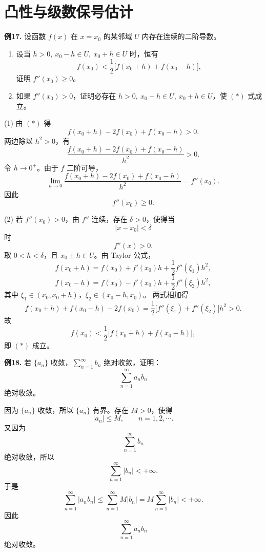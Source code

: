 \section{凸性与级数保号估计}

\begin{problemblock}
\textbf{例17.} 设函数 \(f(x)\) 在 \(x=x_0\) 的某邻域 \(U\) 内存在连续的二阶导数。

\begin{enumerate}[label=(\arabic*)]
\item 设当 \(h>0,\ x_0-h\in U,\ x_0+h\in U\) 时，恒有
\[
f(x_0)<\frac12\bigl[f(x_0+h)+f(x_0-h)\bigr],\tag{*}
\]
证明 \(f''(x_0)\ge0\)。
\item 如果 \(f''(x_0)>0\)，证明必存在 \(h>0,\ x_0-h\in U,\ x_0+h\in U\)，使 \((*)\) 式成立。
\end{enumerate}
\end{problemblock}
\begin{solutionblock}
(1) 由 \((*)\) 得
\[
f(x_0+h)-2f(x_0)+f(x_0-h)>0.
\]
两边除以 \(h^2>0\)，有
\[
\frac{f(x_0+h)-2f(x_0)+f(x_0-h)}{h^2}>0.
\]
令 \(h\to0^+\)。由于 \(f\) 二阶可导，
\[
\lim_{h\to0}
\frac{f(x_0+h)-2f(x_0)+f(x_0-h)}{h^2}
=f''(x_0).
\]
因此
\[
f''(x_0)\ge0.
\]

(2) 若 \(f''(x_0)>0\)，由 \(f''\) 连续，存在 \(\delta>0\)，使得当
\[
|x-x_0|<\delta
\]
时
\[
f''(x)>0.
\]
取 \(0<h<\delta\)，且 \(x_0\pm h\in U\)。由 Taylor 公式，
\[
f(x_0+h)=f(x_0)+f'(x_0)h+\frac12f''(\xi_1)h^2,
\]
\[
f(x_0-h)=f(x_0)-f'(x_0)h+\frac12f''(\xi_2)h^2,
\]
其中 \(\xi_1\in(x_0,x_0+h)\)，\(\xi_2\in(x_0-h,x_0)\)。
两式相加得
\[
f(x_0+h)+f(x_0-h)-2f(x_0)
=\frac12\bigl[f''(\xi_1)+f''(\xi_2)\bigr]h^2>0.
\]
故
\[
f(x_0)<\frac12\bigl[f(x_0+h)+f(x_0-h)\bigr],
\]
即 \((*)\) 成立。
\end{solutionblock}

\begin{problemblock}
\textbf{例18.} 若 \(\{a_n\}\) 收敛，\(\displaystyle \sum_{n=1}^{\infty}b_n\) 绝对收敛，证明：
\[
\sum_{n=1}^{\infty}a_nb_n
\]
绝对收敛。
\end{problemblock}
\begin{solutionblock}
因为 \(\{a_n\}\) 收敛，所以 \(\{a_n\}\) 有界。存在 \(M>0\)，使得
\[
|a_n|\le M,\qquad n=1,2,\cdots.
\]
又因为
\[
\sum_{n=1}^{\infty}b_n
\]
绝对收敛，所以
\[
\sum_{n=1}^{\infty}|b_n|<+\infty.
\]
于是
\[
\sum_{n=1}^{\infty}|a_nb_n|
\le
\sum_{n=1}^{\infty}M|b_n|
=M\sum_{n=1}^{\infty}|b_n|
<+\infty.
\]
因此
\[
\sum_{n=1}^{\infty}a_nb_n
\]
绝对收敛。
\end{solutionblock}
